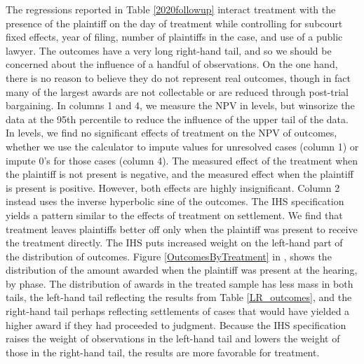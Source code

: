 \documentclass[11pt, a4paper]{article}
\begin{document}
  The regressions reported in Table \ref{2020followup} interact treatment with the presence of the plaintiff on the day of treatment while controlling for subcourt fixed effects, year of filing, number of plaintiffs in the case, and use of a public lawyer. The outcomes have a very long right-hand tail, and so we should be concerned about the influence of a handful of observations. On the one hand, there is no reason to believe they do not represent real outcomes, though in fact many of the largest awards are not collectable or are reduced through post-trial bargaining. In columns 1 and 4, we measure the NPV in levels, but winsorize the data at the 95th percentile to reduce the influence of the upper tail of the data. In levels, we find no significant effects of treatment on the NPV of outcomes, whether we use the calculator to impute values for unresolved cases (column 1) or impute 0's for those cases (column 4). The measured effect of the treatment when the plaintiff is not present is negative, and the measured effect when the plaintiff is present is positive. However, both effects are highly insignificant. Column 2 instead uses the inverse hyperbolic sine of the outcomes. The IHS specification yields a pattern similar to the effects of treatment on settlement. We find that treatment leaves plaintiffs better off only when the plaintiff was present to receive the treatment directly. The IHS puts increased weight on the left-hand part of the distribution of outcomes. Figure \ref{OutcomesByTreatment} in , shows the distribution of the amount awarded when the plaintiff was present at the hearing, by phase. The distribution of awards in the treated sample has less mass in both tails, the left-hand tail reflecting the results from Table \ref{LR_outcomes}, and the right-hand tail perhaps reflecting settlements of cases that would have yielded a higher award if they had proceeded to judgment. Because the IHS specification raises the weight of observations in the left-hand tail and lowers the weight of those in the right-hand tail, the results are more favorable for treatment. 
  
\end{document}
